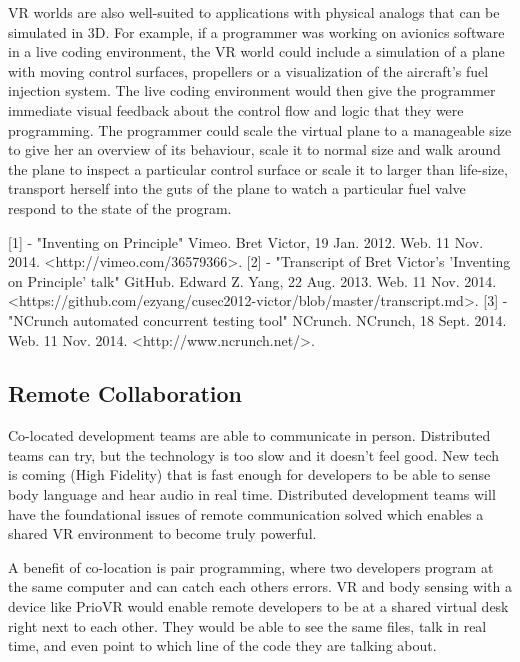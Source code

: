 \documentclass{acm_proc_article-sp}
\begin{document}
VR worlds are also well-suited to applications with physical analogs that can be simulated in 3D. For example, if a programmer was working on avionics software in a live coding environment, the VR world could include a simulation of a plane with moving control surfaces, propellers or a visualization of the aircraft's fuel injection system. The live coding environment would then give the programmer immediate visual feedback about the control flow and logic that they were programming. The programmer could scale the virtual plane to a manageable size to give her an overview of its behaviour, scale it to normal size and walk around the plane to inspect a particular control surface or scale it to larger than life-size, transport herself into the guts of the plane to watch a particular fuel valve respond to the state of the program.

[1] - "Inventing on Principle" Vimeo. Bret Victor, 19 Jan. 2012. Web. 11 Nov. 2014. <http://vimeo.com/36579366>.
[2] - "Transcript of Bret Victor's 'Inventing on Principle' talk" GitHub. Edward Z. Yang, 22 Aug. 2013. Web. 11 Nov. 2014. <https://github.com/ezyang/cusec2012-victor/blob/master/transcript.md>.
[3] - "NCrunch automated concurrent testing tool" NCrunch. NCrunch, 18 Sept. 2014. Web. 11 Nov. 2014. <http://www.ncrunch.net/>.

\subsection{Remote Collaboration}


Co-located development teams are able to communicate in person. Distributed teams can try, but the technology is too slow and it doesn't feel good. New tech is coming (High Fidelity) that is fast enough for developers to be able to sense body language and hear audio in real time.  Distributed development teams will have the foundational issues of remote communication solved which enables a shared VR environment to become truly powerful.

A benefit of co-location is pair programming, where two developers program at the same computer and can catch each others errors. VR and body sensing with a device like PrioVR would enable remote developers to be at a shared virtual desk right next to each other. They would be able to see the same files, talk in real time, and even point to which line of the code they are talking about. 
\end{document}
